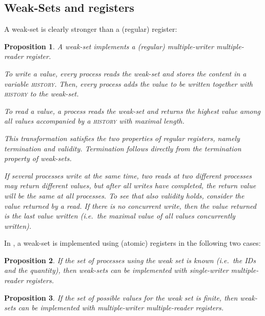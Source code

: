 \documentclass[conference, compsoc]{IEEEtran}
\newtheorem{proposition}{Proposition}
\begin{document}
\subsection{Weak-Sets and registers} 

A weak-set is clearly stronger than a (regular) register:
\begin{proposition}
  A weak-set implements a (regular) multiple-writer multiple-reader register.
 \begin{IEEEproof}
  To write a value, every process reads the weak-set and stores the content in a variable \textsc{history}. Then, every process adds the value to be written together with \textsc{history} to the weak-set.
  
  To read a value, a process reads the weak-set and returns the highest value among all values accompanied by a \textsc{history} with maximal length.
  
  This transformation satisfies the two properties of regular registers, namely termination and validity. Termination follows directly from the termination property of weak-sets.
  
  If several processes write at the same time, two reads at two different processes may return different values, but after all writes have completed, the return value will be the same at all processes. To see that also validity holds, consider the value returned by a read. If there is no concurrent write, then the value returned is the last value written (i.e.~the maximal value of all values concurrently written). 
  
 \end{IEEEproof} 
\end{proposition}

In \cite{DF}, a weak-set is implemented using (atomic) registers in the following two cases:

\begin{proposition} \label{prop:WSbyID}
 If the set of processes using the weak set is known (i.e.~the IDs and the quantity), then weak-sets can be implemented with single-writer multiple-reader registers.
 
\end{proposition}

\begin{proposition} 
 If the set of possible values for the weak set is finite, then weak-sets can be implemented with multiple-writer multiple-reader registers.
 
\end{proposition}
\end{document}
